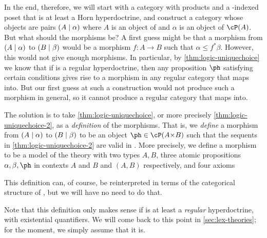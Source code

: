 \begin{wip}
In the end, therefore, we will start with a category \cS with products and a \cS-indexed poset \cP that is at least a Horn hyperdoctrine, and construct a category whose objects are pairs $(A\mid\alpha)$ where $A$ is an object of \cS and $\alpha$ is an object of $\cP(A)$.
But what should the morphisms be?
A first guess might be that a morphism from $(A\mid\alpha)$ to $(B\mid\beta)$ would be a morphism $f:A\to B$ such that $\alpha \le f^*\beta$.
However, this would not give enough morphisms.
In particular, by \cref{thm:logic-uniquechoice} we know that if \cP is a regular hyperdoctrine, then any proposition $\ph$ satisfying certain conditions gives rise to a morphism in any regular category that \cP maps into.
But our first guess at such a construction would not produce such a morphism in general, so it cannot produce a regular category that \cP maps into.

The solution is to take \cref{thm:logic-uniquechoice}, or more precisely \cref{thm:logic-uniquechoice-2}, as a \emph{definition} of the morphisms.
That is, we \emph{define} a morphism from $(A\mid\alpha)$ to $(B\mid\beta)$ to be an object $\ph\in \cP(A\times B)$ such that the sequents in \cref{thm:logic-uniquechoice-2} are valid in \cP.
More precisely, we define a morphism to be a model of the theory with two types $A,B$, three atomic propositions $\alpha,\beta,\ph$ in contexts $A$ and $B$ and $(A,B)$ respectively, and four axioms
This definition can, of course, be reinterpreted in terms of the categorical structure of \cP, but we will have no need to do that.

Note that this definition only makes sense if \cP is at least a \emph{regular} hyperdoctrine, with existential quantifiers.
We will come back to this point in \cref{sec:lex-theories}; for the moment, we simply assume that it is.




\end{wip}


